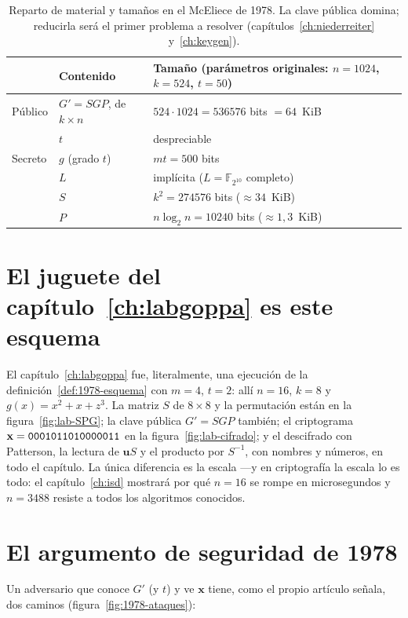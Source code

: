 \documentclass[11pt,a4paper,oneside]{report}
\newcommand{\F}{\mathbb{F}}
\newcommand{\vx}{\mathbf{x}}
\newcommand{\vu}{\mathbf{u}}
\newcommand{\FF}[1]{\F_{2^{#1}}}
\newcommand{\hx}[1]{\text{\texttt{#1}}}
\begin{document}
\begin{table}[htbp]
\centering
\footnotesize
\setlength{\tabcolsep}{6pt}
\begin{tabular}{lll}
\toprule
 & \textbf{Contenido} & \textbf{Tamaño (parámetros originales: $n=1024$, $k=524$, $t=50$)}\\
\midrule
Público & $G'=SGP$, de $k\times n$ & $524\cdot1024=\num{536576}$ bits $=64$~KiB\\
        & $t$ & despreciable\\
Secreto & $g$ (grado $t$) & $mt=\num{500}$ bits\\
        & $L$ & implícita ($L=\FF{10}$ completo)\\
        & $S$ & $k^2=\num{274576}$ bits ($\approx 34$~KiB)\\
        & $P$ & $n\log_2 n=\num{10240}$ bits ($\approx 1{,}3$~KiB)\\
\bottomrule
\end{tabular}
\caption{Reparto de material y tamaños en el McEliece de 1978. La
clave pública domina; reducirla será el primer problema a resolver
(capítulos~\ref{ch:niederreiter} y~\ref{ch:keygen}).}
\label{tab:1978-claves}
\end{table}

\section{El juguete del capítulo~\ref{ch:labgoppa} es este esquema}

El capítulo~\ref{ch:labgoppa} fue, literalmente, una ejecución de la
definición~\ref{def:1978-esquema} con $m=4$, $t=2$: allí $n=16$, $k=8$
y $g(x)=x^2+x+z^3$. La matriz $S$ de $8\times8$ y la permutación están
en la figura~\ref{fig:lab-SPG}; la clave pública $G'=SGP$ también; el
criptograma $\vx=\hx{0001011010000011}$ en la
figura~\ref{fig:lab-cifrado}; y el descifrado con Patterson, la lectura
de $\vu S$ y el producto por $S^{-1}$, con nombres y números, en todo
el capítulo. La única diferencia es la escala —y en criptografía la
escala lo es todo: el capítulo~\ref{ch:isd} mostrará por qué $n=16$ se
rompe en microsegundos y $n=3488$ resiste a todos los algoritmos
conocidos.

\section{El argumento de seguridad de 1978}

Un adversario que conoce $G'$ (y $t$) y ve $\vx$ tiene, como el propio
artículo señala, dos caminos (figura~\ref{fig:1978-ataques}):
\end{document}
